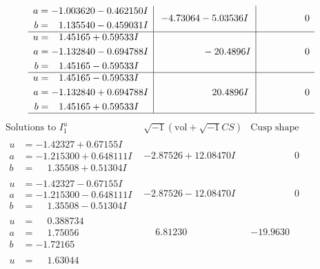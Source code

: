 \documentclass[1p]{elsarticle_modified}
\theoremstyle{definition}
\newcommand{\I}{\sqrt{-1}}
\begin{document}
$$\begin{array}{c|c|c}
\begin{aligned}
a &= -1.003620 - 0.462150 I \\
b &= \phantom{-}1.135540 - 0.459031 I\end{aligned}
 & -4.73064 - 5.03536 I & \phantom{-0.000000 } 0 \\ \hline\begin{aligned}
u &= \phantom{-}1.45165 + 0.59533 I \\
a &= -1.132840 - 0.694788 I \\
b &= \phantom{-}1.45165 - 0.59533 I\end{aligned}
 & \phantom{-0.000000 } -20.4896 I & \phantom{-0.000000 } 0 \\ \hline\begin{aligned}
u &= \phantom{-}1.45165 - 0.59533 I \\
a &= -1.132840 + 0.694788 I \\
b &= \phantom{-}1.45165 + 0.59533 I\end{aligned}
 & \phantom{-0.000000 -}20.4896 I & \phantom{-0.000000 } 0\\
 \hline 
 \end{array}$$\newpage$$\begin{array}{c|c|c}  
\text{Solutions to }I^u_{1}& \I (\text{vol} + \sqrt{-1}CS) & \text{Cusp shape}\\
 \hline 
\begin{aligned}
u &= -1.42327 + 0.67155 I \\
a &= -1.215300 + 0.648111 I \\
b &= \phantom{-}1.35508 + 0.51304 I\end{aligned}
 & -2.87526 + 12.08470 I & \phantom{-0.000000 } 0 \\ \hline\begin{aligned}
u &= -1.42327 - 0.67155 I \\
a &= -1.215300 - 0.648111 I \\
b &= \phantom{-}1.35508 - 0.51304 I\end{aligned}
 & -2.87526 - 12.08470 I & \phantom{-0.000000 } 0 \\ \hline\begin{aligned}
u &= \phantom{-}0.388734\phantom{ +0.000000I} \\
a &= \phantom{-}1.75056\phantom{ +0.000000I} \\
b &= -1.72165\phantom{ +0.000000I}\end{aligned}
 & \phantom{-}6.81230\phantom{ +0.000000I} & -19.9630\phantom{ +0.000000I} \\ \hline\begin{aligned}
u &= \phantom{-}1.63044\phantom{ +0.000000I} \\

\end{aligned}
\end{array}$$
\end{document}
